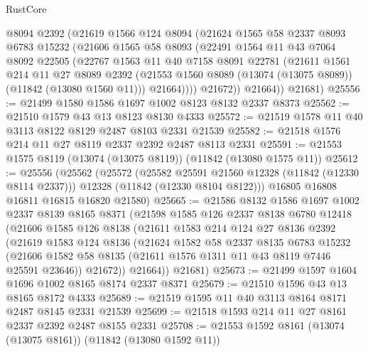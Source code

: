 \begin{lexlean}{RustCore}
\begin{coremodule}
          @8094
          @2392
          (@21619
            @1566
            @124
            @8094
            (@21624
              @1565
              @58
              @2337
              @8093
              @6783
              @15232
              (@21606
                @1565
                @58
                @8093
                (@22491
                  @1564
                  @11
                  @43
                  @7064
                  @8092
                  @22505
                  (@22767
                    @1563
                    @11
                    @40
                    @7158
                    @8091
                    @22781
                    (@21611
                      @1561
                      @214
                      @11
                      @27
                      @8089
                      @2392
                      (@21553 @1560 @8089 (@13074 (@13075 @8089)) (@11842 (@13080 @1560 @11)))
                      @21664))))
              @21672))
          @21664))
      @21681)
@25556 := @21499 @1580 @1586 @1697 @1002 @8123 @8132 @2337 @8373
@25562 := @21510 @1579 @43 @13 @8123 @8130 @4333
@25572 := @21519 @1578 @11 @40 @3113 @8122 @8129 @2487 @8103 @2331 @21539
@25582 := @21518 @1576 @214 @11 @27 @8119 @2337 @2392 @2487 @8113 @2331
@25591 := @21553 @1575 @8119 (@13074 (@13075 @8119)) (@11842 (@13080 @1575 @11))
@25612 := @25556
    (@25562
      (@25572
        (@25582 @25591 @21560 @12328 (@11842 (@12330 @8114 @2337)))
        @12328
        (@11842 (@12330 @8104 @8122)))
      @16805
      @16808
      @16811
      @16815
      @16820
      @21580)
@25665 := @21586
    @8132
    @1586
    @1697
    @1002
    @2337
    @8139
    @8165
    @8371
    (@21598
      @1585
      @126
      @2337
      @8138
      @6780
      @12418
      (@21606
        @1585
        @126
        @8138
        (@21611
          @1583
          @214
          @124
          @27
          @8136
          @2392
          (@21619
            @1583
            @124
            @8136
            (@21624
              @1582
              @58
              @2337
              @8135
              @6783
              @15232
              (@21606 @1582 @58 @8135 (@21611 @1576 @1311 @11 @43 @8119 @7446 @25591 @23646))
              @21672))
          @21664))
      @21681)
@25673 := @21499 @1597 @1604 @1696 @1002 @8165 @8174 @2337 @8371
@25679 := @21510 @1596 @43 @13 @8165 @8172 @4333
@25689 := @21519 @1595 @11 @40 @3113 @8164 @8171 @2487 @8145 @2331 @21539
@25699 := @21518 @1593 @214 @11 @27 @8161 @2337 @2392 @2487 @8155 @2331
@25708 := @21553 @1592 @8161 (@13074 (@13075 @8161)) (@11842 (@13080 @1592 @11))

\end{coremodule}
\end{lexlean}
